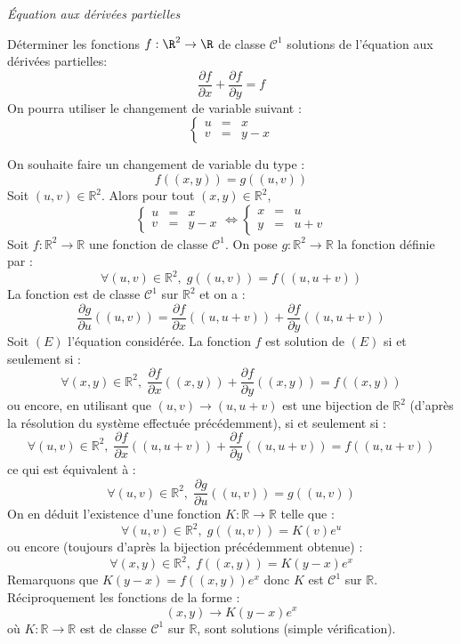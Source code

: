 \documentclass[a4paper,10pt]{report}
\begin{document}
\medskip

\begin{center}
\textit{{ {\large Équation aux dérivées partielles}}}
\end{center}

\medskip



\begin{Exa} Déterminer les fonctions $f : \R^{2} \rightarrow \R$ de classe $\mathcal{C}^{1}$ solutions de l'équation aux dérivées partielles:
  \[
  \frac{\partial f}{\partial x} + \frac{\partial f}{\partial y} = f
  \]
On pourra utiliser le changement de variable suivant :
  \[
  \left\lbrace\begin{array}{lll}
    u & = &  x \\
    v & = & y - x
  \end{array}\right.
  \]
\end{Exa} 

\corr On souhaite faire un changement de variable du type :
$$ f((x,y))=g((u,v))$$
Soit $(u,v) \in \mathbb{R}^2$. Alors pour tout $(x,y) \in \mathbb{R}^2$,
$$  \left\lbrace\begin{array}{lll}
    u & = &  x \\
    v & = & y - x
  \end{array}\right. \Longleftrightarrow  \left\lbrace\begin{array}{lll}
    x & = &  u \\
    y & = & u+v
  \end{array}\right.$$
 Soit $f : \mathbb{R}^2 \rightarrow \mathbb{R}$ une fonction de classe $\mathcal{C}^1$. On pose $g : \mathbb{R}^2 \rightarrow \mathbb{R}$ la fonction définie par :
 $$ \forall (u,v) \in \mathbb{R}^2, \; g((u,v)) = f((u,u+v))$$
 La fonction est de classe $\mathcal{C}^1$ sur $\mathbb{R}^2$ et on a :
 $$ \dfrac{\partial g}{\partial u} ((u,v)) = \dfrac{\partial f}{\partial x} ((u,u+v)) + \dfrac{\partial f}{\partial y} ((u,u+v))$$
 Soit $(E)$ l'équation considérée. La fonction $f$ est solution de $(E)$ si et seulement si :
 $$ \forall (x,y) \in \mathbb{R}^2, \;  \frac{\partial f}{\partial x}((x,y)) + \frac{\partial f}{\partial y}((x,y)) = f((x,y))$$
 ou encore, en utilisant que $(u,v) \rightarrow (u,u+v)$ est une bijection de $\mathbb{R}^2$ (d'après la résolution du système effectuée précédemment), si et seulement si :
 $$ \forall (u,v) \in \mathbb{R}^2, \;  \frac{\partial f}{\partial x}((u,u+v)) + \frac{\partial f}{\partial y}((u,u+v)) = f((u,u+v))$$
 ce qui est équivalent à :
 $$ \forall (u,v) \in \mathbb{R}^2, \; \dfrac{\partial g}{\partial u} ((u,v)) = g((u,v))$$
On en déduit l'existence d'une fonction $K : \mathbb{R} \rightarrow \mathbb{R}$ telle que :
$$  \forall (u,v) \in \mathbb{R}^2, \; g((u,v)) = K(v) e^{u}$$
ou encore (toujours d'après la bijection précédemment obtenue) :
$$  \forall (x,y) \in \mathbb{R}^2, \;  f((x,y)) = K(y-x) e^x$$
Remarquons que $K(y-x)= f((x,y))e^{x}$ donc $K$ est $\mathcal{C}^1$ sur $\mathbb{R}$. Réciproquement les fonctions de la forme :
$$ (x,y) \rightarrow  K(y-x) e^x$$
où $K : \mathbb{R} \rightarrow \mathbb{R}$ est de classe $\mathcal{C}^1$ sur $\mathbb{R}$, sont solutions (simple vérification).
\end{document}
